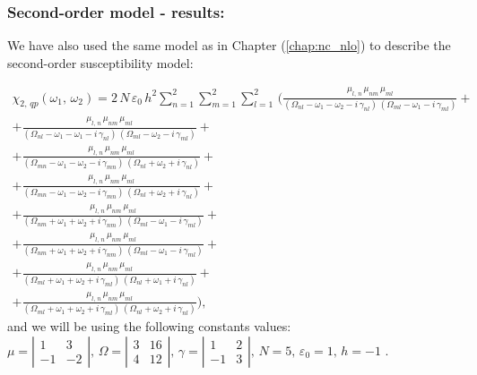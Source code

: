 \documentclass[12pt,twoside,a4paper]{article}
\numberwithin{equation}{subsection}
\numberwithin{figure}{subsection}
\begin{document}
\subsubsection*{Second-order model - results:}

We have also used the same model as in Chapter (\ref{chap:nc_nlo}) to describe the second-order susceptibility model:

\begin{multline} \label{eq:four_qp2}
  \chi_{2, \,qp}({\omega_{1}}, \,{\omega_{2}}) = 
   2\,N\,\varepsilon_{0}\,h^{2}\sum_{n=1}^{2}\sum_{m=1}^{2}\sum_{l=1}^{2}\,
  (      \frac {{\mu_{l,\,n}}\,{\mu_{nm}}\,{\mu_{ml}}}
      {({\Omega_{nl}} - \omega_1 - \omega_2 - i\,{\gamma_{nl}})\,({\Omega_{ml}} - \omega_1 - i\,{\gamma_{ml}})} 
  + \\ + \frac {{\mu_{l, \,n}}\,{\mu_{nm}}\,{\mu_{ml}}}
      {({\Omega_{nl}} - \omega_1 - \omega_1 - i\,{\gamma_{nl}})\,({\Omega_{ml}} - \omega_2 - i\,{\gamma_{ml}})}
  + \\ + \frac {{\mu_{l, \,n}}\,{\mu_{nm}}\,{\mu_{ml}}}
      {({\Omega_{mn}} - \omega_1 - \omega_2 - i\,{\gamma_{mn}})\,({\Omega_{nl}} + \omega_2 + i\,{\gamma_{nl}})}
  + \\ + \frac{{\mu_{l, \,n }}\,{\mu_{nm}}\,{\mu_{ml}}} 
      {({\Omega_{mn}} - \omega_1 - \omega_2 - i\,{\gamma_{mn}})\,({\Omega_{nl}} + \omega_2 + i\,{\gamma_{nl}})} 
  + \\ + \frac {{\mu_{l, \,n}}\,{\mu_{nm}}\,{\mu_{ml}}}
      {({\Omega_{nm}} + \omega_1 + \omega_2 + i\,{\gamma_{nm}})\,({\Omega_{ml}} - \omega_1 - i\,{\gamma_{ml}})}
  + \\ + \frac {{\mu_{l, \,n}}\,{\mu_{ nm}}\,{\mu_{ml}}}
      {({\Omega_{nm}} + \omega_1 + \omega_2 + i\,{\gamma_{nm}})\,({\Omega_{ml}} - \omega_1 - i\,{\gamma_{ml}})} 
  + \\ + \frac {{\mu_{l, \,n}}\,{\mu_{nm}}\,{\mu_{ml}}}
      {({\Omega_{ml}} + \omega_1 + \omega_2 + i\,{\gamma_{ml}})\,({\Omega_{nl}} + \omega_1 + i\,{\gamma_{nl}})}
  + \\ + \frac {{\mu_{l, \,n}}\,{\mu_{nm}}\,{\mu_{ml}}}
      {({\Omega_{ml}} + \omega_1 + \omega_2 + i\,{\gamma_{ml}})\,({\Omega_{nl}} + \omega_2 + i\,{\gamma_{nl}})}
  ) ,
\end{multline}
and we will be using the following constants values:
$\mu = \left| \begin{array}{cc} 
    1 & 3 \\ -1 & -2 
  \end{array} \right|,\, 
  \Omega = \left| \begin{array}{cc} 
    3 & 16 \\ 4 & 12 
  \end{array} \right|,\,
  \gamma = \left| \begin{array}{cc} 
  1 & 2 \\ -1 & 3
  \end{array} \right|,\, N=5,\, {\varepsilon_{0}}=1,\,h= - 1$ .
\end{document}
